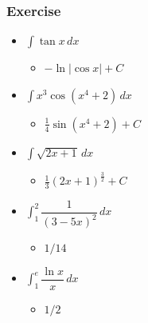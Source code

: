 \documentclass[t]{beamer}
\theoremstyle{plain}
\theoremstyle{definition}
\newcommand{\ds}{\displaystyle}
\begin{document}
\begin{frame}

\frametitle{Exercise}

\begin{itemize}
	\item $\ds \int \tan{x} \,dx$
	\begin{itemize}
		\item $- \ln{|\cos{x}|} + C$
	\end{itemize}
	\item $\ds \int x^3 \cos({x^4 + 2})\,dx$
	\begin{itemize}
		\item $\frac{1}{4} \sin({x^4 + 2}) + C$
	\end{itemize}
	\item $\ds \int \sqrt{2x + 1} \, dx$
	\begin{itemize}
		\item $\frac{1}{3}(2x + 1)^{\frac{3}{2}} + C$
	\end{itemize}
	\item $\ds \int_{1}^{2} \dfrac{1}{(3 - 5x)^2} \, dx$
	\begin{itemize}
		\item $1/14$
	\end{itemize}
	\item $\ds \int_{1}^{e} \dfrac{\ln{x}}{x} \, dx$
	\begin{itemize}
		\item $1/2$
	\end{itemize}
\end{itemize}

\end{frame}
\end{document}
